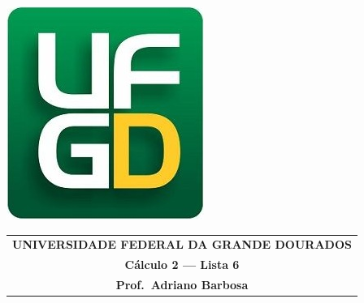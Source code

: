 \documentclass[a4paper,5pt]{amsbook}
\begin{document}
\thispagestyle{empty}
\pagestyle{empty}
\begin{minipage}[h]{0.14\textwidth}
	\includegraphics[scale=0.24]{../../ufgd.png}
\end{minipage}
\begin{minipage}[h]{\textwidth}
\begin{tabular}{c}
{{\bf UNIVERSIDADE FEDERAL DA GRANDE DOURADOS}}\\
{{\bf C\'{a}lculo 2 --- Lista 6}}\\
{{\bf Prof.\ Adriano Barbosa}}\\
\end{tabular}
\vspace{-0.45cm}
%
\end{minipage}

\end{document}
